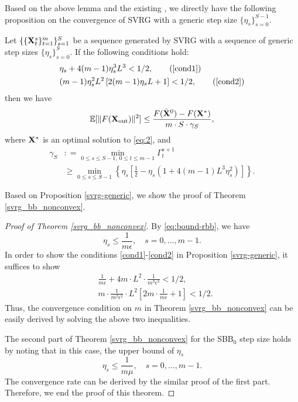 \documentclass[./sbb_ordinal_embedding_aaai18.tex]{subfiles}%
\begin{document}
Based on the above lemma and the existing \cite[Theorem 2]{pmlr-v48-reddi16}, we directly have the following proposition on the convergence of SVRG with a generic step size $\{\eta_s\}_{s=0}^{S-1}$.

\begin{proposition}
\label{svrg-generic}
Let $\{\{{\bf X}_t^s\}_{t=1}^m\}_{s=1}^S$ be a sequence generated by SVRG with a sequence of generic step sizes $\{\eta_s\}_{s=0}^S$. If the following conditions hold:
\begin{align}
&\eta_s + 4(m-1)\eta_s^3 L^3 < 1/2,\tag{\ref{cond1}}\\
&(m-1)\eta_s^2L^2\left[ 2(m-1)\eta_s L +1 \right]<1/2,\tag{\ref{cond2}}
\end{align}
then we have
\[
\mathbb{E}[\|F({\bf X}_{\mathrm{out}})\|^2] \leq \frac{F(\tilde{\bf X}^0) - F({\bf X}^*)}{m \cdot S \cdot \gamma_S},
\]
where ${\bf X}^*$ is an optimal solution to \eqref{eq:2}, and
\begin{align*}
\gamma_S
&: = \min_{0\leq s \leq S-1,\ 0 \leq t \leq m-1} \Gamma_t^{s+1}\\
&\geq \min_{0\leq s \leq S-1} \left\{\eta_s\left[ \frac{1}{2} - \eta_s(1+4(m-1)L^3\eta_s^2)\right]\right\}.
\end{align*}
\end{proposition}

Based on Proposition \ref{svrg-generic}, we show the proof of Theorem \ref{svrg_bb_nonconvex}.

\begin{proof}[Proof of Theorem \ref{svrg_bb_nonconvex}]
By \eqref{eq:bound-rbb}, we have
\[
\eta_s \leq \frac{1}{m\epsilon}, \quad s = 0,\ldots, m-1.
\]
In order to show the conditions \eqref{cond1}-\eqref{cond2} in Proposition \ref{svrg-generic}, it suffices to show
\begin{align*}
&\frac{1}{m\epsilon} + 4m\cdot L^2 \cdot \frac{1}{m^3\epsilon^3} < 1/2,\\
& m \cdot \frac{1}{m^2\epsilon^2} \cdot L^2 \left[2m \cdot \frac{1}{m \epsilon} +1 \right]<1/2.
\end{align*}
Thus, the convergence condition on $m$ in Theorem \ref{svrg_bb_nonconvex} can be easily derived by solving the above two inequalities.


The second part of Theorem \ref{svrg_bb_nonconvex} for the SBB$_0$ step size holds by noting that in this case, the upper bound of $\eta_s$
\[
\eta_s \leq \frac{1}{m\mu}, \quad s = 0,\ldots, m-1.
\]
The convergence rate can be derived by the similar proof of the first part.
Therefore, we end the proof of this theorem.
\end{proof}
\end{document}
